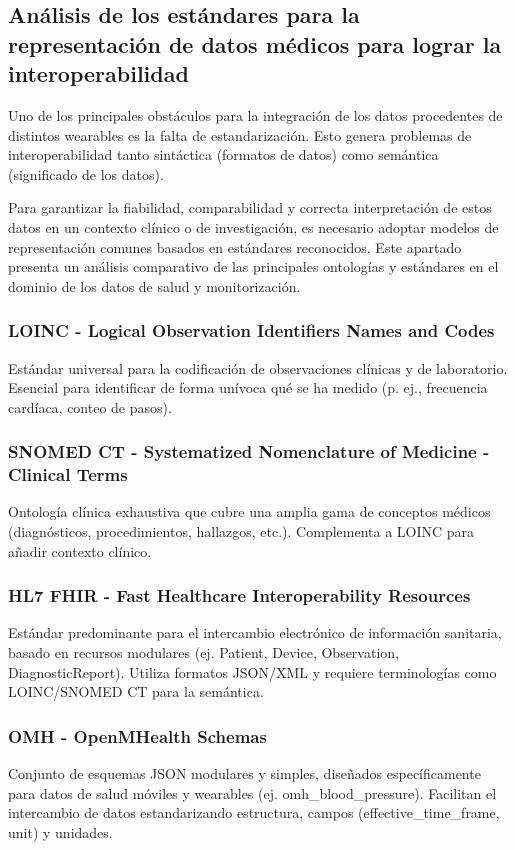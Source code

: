 \subsection{Análisis de los estándares para la representación de datos médicos para lograr la interoperabilidad}
Uno de los principales obstáculos para la integración de los datos procedentes de distintos wearables es la falta de estandarización. Esto genera problemas de interoperabilidad tanto sintáctica (formatos de datos) como semántica (significado de los datos).

Para garantizar la fiabilidad, comparabilidad y correcta interpretación de estos datos en un contexto clínico o de investigación, es necesario adoptar modelos de representación comunes basados en estándares reconocidos. Este apartado presenta un análisis comparativo de las principales ontologías y estándares  en el dominio de los datos de salud y monitorización. 

\subsubsection{LOINC - Logical Observation Identifiers Names and Codes}
Estándar universal para la codificación de observaciones clínicas y de laboratorio. Esencial para identificar de forma unívoca qué se ha medido (p. ej., frecuencia cardíaca, conteo de pasos).

\subsubsection{SNOMED CT - Systematized Nomenclature of Medicine - Clinical Terms}
Ontología clínica exhaustiva que cubre una amplia gama de conceptos médicos (diagnósticos, procedimientos, hallazgos, etc.). Complementa a LOINC para añadir contexto clínico. \cite{SNOMEDCT}


\subsubsection{HL7 FHIR  - Fast Healthcare Interoperability Resources}
Estándar predominante para el intercambio electrónico de información sanitaria, basado en recursos modulares (ej. Patient, Device, Observation, DiagnosticReport). Utiliza formatos JSON/XML y requiere terminologías como LOINC/SNOMED CT para la semántica. \cite{HL7FHIR} 

\subsubsection{OMH - OpenMHealth Schemas}
Conjunto de esquemas JSON modulares y simples, diseñados específicamente para datos de salud móviles y wearables (ej. omh\_blood\_pressure). Facilitan el intercambio de datos estandarizando estructura, campos (effective\_time\_frame, unit) y unidades. \cite{OpenmHealth}

